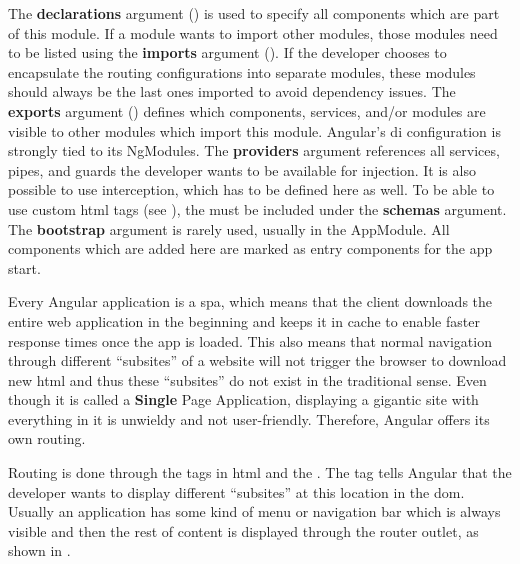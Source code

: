 The \textbf{declarations} argument () is used to specify all components which are part of this module. If a module wants to import other modules, those modules need to be listed using the \textbf{imports} argument (). If the developer chooses to encapsulate the routing configurations into separate modules, these modules should always be the last ones imported to avoid dependency issues. The \textbf{exports} argument () defines which components, services, and/or modules are visible to other modules which import this module. Angular's \gls{di} configuration is strongly tied to its NgModules. The \textbf{providers} argument references all services, pipes, and guards the developer wants to be available for injection. It is also possible to use interception, which has to be defined here as well. To be able to use custom \gls{html} tags (see ), the  must be included under the \textbf{schemas} argument. The \textbf{bootstrap} argument is rarely used, usually in the AppModule. All components which are added here are marked as entry components for the app start.


Every Angular application is a \gls{spa}, which means that the client downloads the entire web application in the beginning and keeps it in cache to enable faster response times once the app is loaded. This also means that normal navigation through different \enquote{subsites} of a website will not trigger the browser to download new \gls{html} and thus these \enquote{subsites} do not exist in the traditional sense. Even though it is called a \textbf{Single} Page Application, displaying a gigantic site with everything in it is unwieldy and not user-friendly. Therefore, Angular offers its own routing.


Routing is done through the  tags in \gls{html} and the . The  tag tells Angular that the developer wants to display different \enquote{subsites} at this location in the \gls{dom}. Usually an application has some kind of menu or navigation bar which is always visible and then the rest of content is displayed through the router outlet, as shown in .

